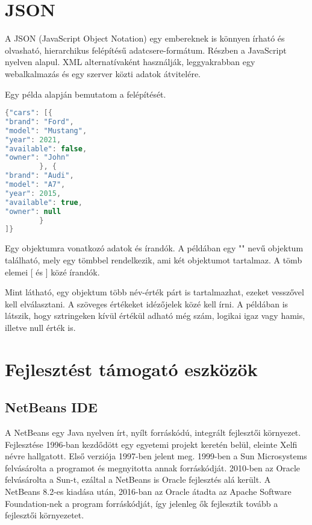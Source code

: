 \section{JSON}

A JSON (JavaScript Object Notation) egy embereknek is könnyen írható és olvasható, hierarchikus felépítésű adatcsere-formátum.
Részben a JavaScript nyelven alapul.
XML alternatívaként használják, leggyakrabban egy webalkalmazás és egy szerver közti adatok átvitelére.\cite{json}

Egy példa alapján bemutatom a felépítését. 

\begin{lstlisting}[language=Java]
{"cars": [{ 
"brand": "Ford", 
"model": "Mustang", 
"year": 2021, 
"available": false, 
"owner": "John" 
        }, { 
"brand": "Audi", 
"model": "A7", 
"year": 2015, 
"available": true, 
"owner": null 
        } 
]} 
\end{lstlisting}

Egy objektumra vonatkozó adatok { és } írandók.
A példában egy "" nevű objektum található, mely egy tömbbel rendelkezik, ami két objektumot tartalmaz.
A tömb elemei [ és ] közé írandók.

Mint látható, egy objektum több név-érték párt is tartalmazhat, ezeket vesszővel kell elválasztani.
A szöveges értékeket idézőjelek közé kell írni.
A példában is látszik, hogy sztringeken kívül értékül adható még szám, logikai igaz vagy hamis, illetve null érték is. 



\section{Fejlesztést támogató eszközök}

\subsection{NetBeans IDE} 

A NetBeans egy Java nyelven írt, nyílt forráskódú, integrált fejlesztői környezet.
Fejlesztése 1996-ban kezdődött egy egyetemi projekt keretén belül, eleinte Xelfi névre hallgatott.
Első verziója 1997-ben jelent meg.
1999-ben a Sun Microsystems felvásárolta a programot és megnyitotta annak forráskódját.
2010-ben az Oracle felvásárolta a Sun-t, ezáltal a NetBeans is Oracle fejlesztés alá került.
A NetBeans 8.2-es kiadása után, 2016-ban az Oracle átadta az Apache Software Foundation-nek a program forráskódját, így jelenleg ők fejlesztik tovább a fejlesztői környezetet.\cite{netbeans}\cite{netbeans2}

